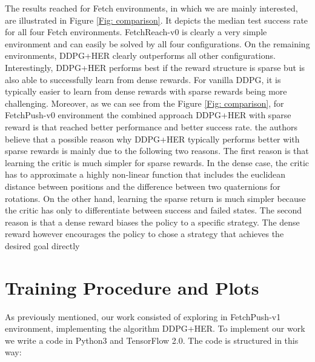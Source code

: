 \documentclass[a4paper]{report}
\begin{document}
The results reached for Fetch environments, in which we are mainly interested, are illustrated in Figure \ref{Fig: comparison}. It depicts the median test success rate for all four Fetch environments. FetchReach-v0 is clearly a very simple environment and can easily be solved by all four configurations. On the remaining environments, DDPG+HER clearly outperforms all other configurations. Interestingly, DDPG+HER performs best if the reward structure is sparse but is also able to successfully learn from dense rewards. For vanilla DDPG, it is typically easier to learn from dense rewards with sparse rewards being more challenging. Moreover, as we can see from the Figure \ref{Fig: comparison}, for FetchPush-v0 environment the combined approach DDPG+HER with sparse reward is that reached better performance and better success rate. the authors believe that a possible reason why DDPG+HER typically performs better with sparse rewards is mainly due to the following two reasons. The first reason is that learning the critic is much simpler for sparse rewards. In the dense case, the critic has to approximate a highly non-linear function that includes the euclidean distance between positions and the difference between two quaternions for rotations. On the other hand, learning the sparse return is much simpler because the critic has only to differentiate between success and failed states.
The second reason is that a dense reward biases the policy to a specific strategy. The dense reward however encourages the policy to chose a strategy that achieves the desired goal directly
 







\chapter{Training Procedure and Plots \label{exp}}

As previously  mentioned, our work consisted of exploring in FetchPush-v1 environment, implementing the algorithm DDPG+HER. To implement our work we write a code in Python3 and TensorFlow 2.0. The code is structured in this way:
\end{document}

